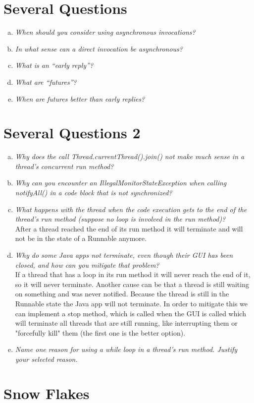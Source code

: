 \documentclass{report}
\author{Marcel \textsc{Zauder} 16-124-836 \\
	Pascal \textsc{Gerig} 16-104-721}
\begin{document}
	\section{Several Questions}
	\startsection
		\begin{enumerate}[a)]
			\item \textit{When should you consider using asynchronous invocations?} \\
			\item \textit{In what sense can a direct invocation be asynchronous?} \\
			\item \textit{What is an “early reply”?} \\
			\item \textit{What are “futures”?} \\
			\item \textit{When are futures better than early replies?} \\
		\end{enumerate}
	\closesection
	
	\section{Several Questions 2}
	\startsection
		\begin{enumerate}[a)]
			\item \textit{Why does the call Thread.currentThread().join() not make much sense in a thread’s concurrent run
method?} \\
			\item \textit{Why can you encounter an IllegalMonitorStateException when calling notifyAll() in a code block
that is not synchronized?} \\
			\item \textit{What happens with the thread when the code execution gets to the end of the thread’s run method
(suppose no loop is involved in the run method)?} \\
			After a thread reached the end of its run method it will terminate and will not be in the state of a Runnable anymore.
			\item \textit{Why do some Java apps not terminate, even though their GUI has been closed, and how can you
mitigate that problem?} \\
			If a thread that has a loop in its run method it will never reach the end of it, so it will never terminate. Another cause can be that a thread is still waiting on something and was never notified. Because the thread is still in the Runnable state the Java app will not terminate. In order to mitigate this we can implement a stop method, which is called when the GUI is called which will terminate all threads that are still running, like interrupting them or "forcefully kill" them (the first one is the better option).
			\item \textit{Name one reason for using a while loop in a thread’s run method. Justify your selected reason.} \\
		\end{enumerate}
	\closesection
	
	\section{Snow Flakes}
	\startsection
		\begin{enumerate}
		\end{enumerate}
	\closesection
\end{document}
